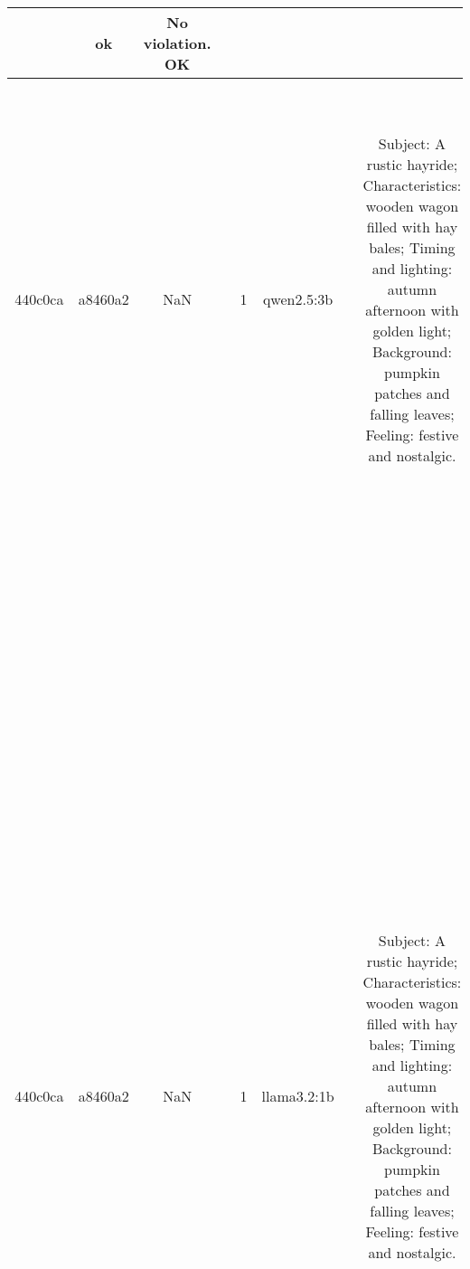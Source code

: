 \begin{table}[h!]
\begin{tabular}{|c|c|c|c|c|c|c|c|c|c|c|}
 & ok & No violation.
OK\\
\hline
440c0ca & a8460a2 & NaN &  & 1 & qwen2.5:3b &  & Subject: A rustic hayride; Characteristics: wooden wagon filled with hay bales; Timing and lighting: autumn afternoon with golden light; Background: pumpkin patches and falling leaves; Feeling: festive and nostalgic. & A rustic hayride scene hangs in the air, a wooden wagon laden with hay bales stands in an autumn afternoon framed by golden light casting over pumpkin patches and fallen leaves creating a festively nostalgic atmosphere. & ok & No violation.
OK\\
\hline
440c0ca & a8460a2 & NaN &  & 1 & llama3.2:1b &  & Subject: A rustic hayride; Characteristics: wooden wagon filled with hay bales; Timing and lighting: autumn afternoon with golden light; Background: pumpkin patches and falling leaves; Feeling: festive and nostalgic. & For the first prompt, here's a detailed paragraph:

"Imagine a charming autumn afternoon, bathed in warm golden light as a rustical wooden wagon filled to the brim with plush hay bales is pulled down a winding dirt path through vibrant pumpkin patches. The scent of damp earth and wood smoke wafts through the air as the fading leaves provide a kaleidoscope of color against the rustic backdrop. Golden hues dance across the pumpkins, casting long shadows that stretch like gentle fingers towards the wagon's tired yet inviting figure." & ok & No violation.
OK\\
\hline
13f2b6b & a8460a2 & NaN &  & 1 & gpt-4o-mini &  & Subject: A serene lotus pond; Characteristics: blooming lotus flowers and lily pads; Timing and lighting: early morning with misty atmosphere; Background: traditional Asian architecture; Feeling: peaceful and harmonious. & Capture a serene lotus pond adorned with blooming lotus flowers and vibrant lily pads in early morning light, enveloped by a gentle mist that lends an ethereal quality. In the background, traditional Asian architecture rises gracefully, its soft lines harmonizing with the tranquil scene. The overall ambiance evokes a deep sense of peace and harmony, inviting the viewer to immerse themselves in this idyllic moment of natural beauty and cultural grace. & ok & No violation.
OK\\
\hline
13f2b6b & a8460a2 & NaN &  & 1 & gemma2:9b &  & Subject: A serene lotus pond; Characteristics: blooming lotus flowers and lily pads; Timing and lighting: early morning with misty atmosphere; Background: traditional Asian architecture; Feeling: peaceful and harmonious. & Capture an ethereal scene of a serene lotus pond bathed in the soft, misty light of an early morning sun.  Blooming lotus flowers and lush green lily pads float gracefully on the still water's surface, their delicate petals reflecting the dawn's gentle hues. In the background, traditional Asian architecture stands majestic, its intricate carvings hinting at centuries-old wisdom. The overall image should evoke a sense of profound peace and harmonious balance.



\end{tabular}
\end{table}
